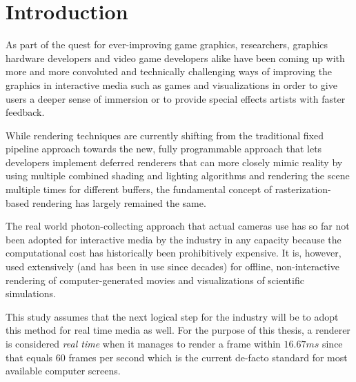 \documentclass[
  twoside,
  11pt, a4paper,
  footinclude=true,
  headinclude=true,
  cleardoublepage=empty
]{scrreprt}
\begin{document}
\tableofcontents

\chapter{Introduction}
As part of the quest for ever-improving game graphics, researchers, graphics hardware developers
and video game developers alike have been coming up with more and more convoluted and technically
challenging ways of improving the graphics in interactive media such as games and visualizations in order to give
users a deeper sense of immersion or to provide special effects artists with faster feedback.

While rendering techniques are currently shifting from the traditional fixed pipeline approach
towards the new, fully programmable approach that lets developers implement deferred renderers that
can more closely mimic reality by using multiple combined shading and lighting algorithms and
rendering the scene multiple times for different buffers, the
fundamental concept of rasterization-based rendering has largely remained the same.

The real world photon-collecting approach that actual cameras use has so far not been adopted for
interactive media by the industry in any capacity because the computational cost has historically
been prohibitively expensive. It is, however, used extensively (and has been in use since decades)
for offline, non-interactive rendering of computer-generated movies and visualizations of scientific simulations.

This study assumes that the next logical step for the industry will be to adopt
this method for real time media as well. For the purpose of this thesis, a renderer is considered
\textit{real time} when it manages to render a frame within \(16.67ms\) since that equals 60 frames per second
which is the current de-facto standard for most available computer screens.
\end{document}
